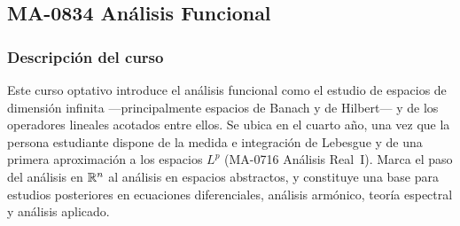 \newpage
\subsection*{MA-0834 Análisis Funcional}

\hypertarget{MA0834}{}
\begin{refsection}
\begin{table}[H]
\end{table}

\subsubsection*{Descripción del curso}

Este curso optativo introduce el análisis funcional como el estudio de espacios de dimensión infinita ---principalmente espacios de Banach y de Hilbert--- y de los operadores lineales acotados entre ellos. Se ubica en el cuarto año, una vez que la persona estudiante dispone de la medida e integración de Lebesgue y de una primera aproximación a los espacios $L^p$ (MA-0716 Análisis Real~I). Marca el paso del análisis en $\mathbb{R}^n$ al análisis en espacios abstractos, y constituye una base para estudios posteriores en ecuaciones diferenciales, análisis armónico, teoría espectral y análisis aplicado.


\end{refsection}
